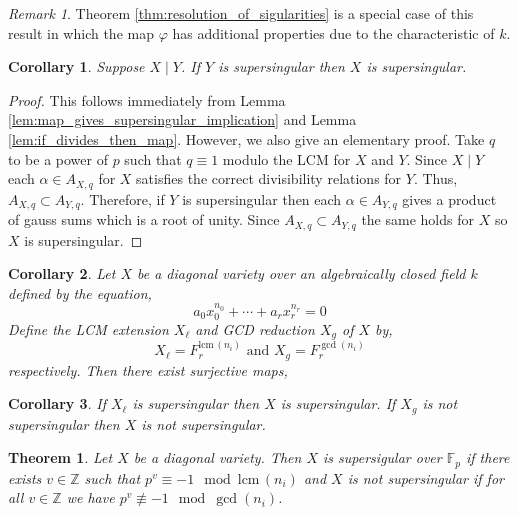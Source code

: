 \documentclass{article}
\newcommand{\Z}{\mathbb{Z}}
\newcommand{\finfield}[1]{\mathbb{F}_{#1}}
\newcommand{\divides}{\mid}
\newcommand{\lcm}[0]{\mathrm{lcm} \,}
\newtheorem{theorem}{Theorem}[section]
\newtheorem{corollary}{Corollary}[theorem]
\theoremstyle{definition}
\theoremstyle{definition}
\theoremstyle{remark}
\newtheorem*{remark}{Remark}
\begin{document}
\begin{remark}
Theorem \ref{thm:resolution_of_sigularities} is a special case of this result in which the map $\varphi$ has additional properties due to the characteristic of $k$.
\end{remark}

\begin{corollary} \label{cor:divides_then_supersingular_implication}
Suppose $X \divides Y$. If $Y$ is supersingular then $X$ is supersingular. 
\end{corollary}

\begin{proof}
This follows immediately from Lemma \ref{lem:map_gives_supersingular_implication} and Lemma \ref{lem:if_divides_then_map}. However, we also give an elementary proof. Take $q$ to be a power of $p$ such that $q \equiv 1$ modulo the LCM for $X$ and $Y$. Since $X \divides Y$ each $\alpha \in A_{X,q}$ for $X$ satisfies the correct divisibility relations for $Y$. Thus, $A_{X,q} \subset A_{Y,q}$. Therefore, if $Y$ is supersingular then each $\alpha \in A_{Y,q}$ gives a product of gauss sums which is a root of unity. Since $A_{X,q} \subset A_{Y,q}$ the same holds for $X$ so $X$ is supersingular.  
\end{proof}

\begin{corollary}
Let $X$ be a diagonal variety over an algebraically closed field $k$ defined by the equation,
\[ a_0 x_0^{n_0} + \cdots + a_r x_r^{n_r} = 0 \]
Define the LCM extension $X_{\ell}$ and GCD reduction $X_g$ of $X$ by,
\[ X_{\ell} = F^{\lcm{(n_i)}}_r \text{ and } X_g = F^{\gcd{(n_i)}}_r \]
respectively. Then there exist surjective maps,
\begin{center}
\end{center}
\end{corollary}

\begin{corollary} \label{cor:important_reduction_maps}
If $X_{\ell}$ is supersingular then $X$ is supersingular. If $X_g$ is not supersingular then $X$ is not supersingular. 
\end{corollary}

\begin{theorem}
Let $X$ be a diagonal variety. Then $X$ is supersigular over $\finfield{p}$ if there exists $v \in \Z$ such that $p^v \equiv -1 \mod {\lcm(n_i)}$ and $X$ is not supersingular if for all $v \in \Z$ we have $p^v \not\equiv -1 \mod{\gcd{(n_i)}}$.  
\end{theorem}
\end{document}
